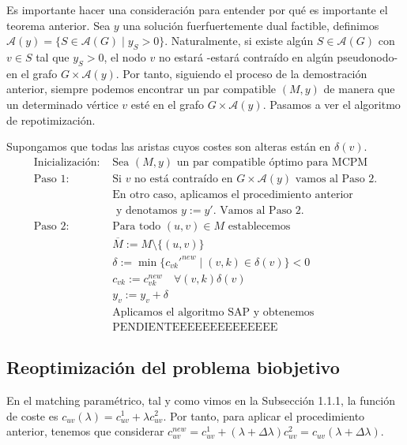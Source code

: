 \documentclass[twoside,a4paper,openright,12pt]{book}
\begin{document}
Es importante hacer una consideración para entender por qué es importante el teorema anterior. Sea $y$ una solución fuerfuertemente dual factible, definimos $\mathcal{A}(y)=\{S\in \mathcal{A}(G)\mid y_S>0\}$. Naturalmente, si existe algún $S \in \mathcal{A}(G)$ con $v\in S$ tal que $y_S >0$, el nodo $v$ no estará -estará contraído en algún pseudonodo- en el grafo $G\times \mathcal{A}(y)$. Por tanto, siguiendo el proceso de la demostración anterior, siempre podemos encontrar un par compatible $(M,y)$ de manera que un determinado vértice $v$ esté en el grafo $G\times \mathcal{A}(y)$. Pasamos a ver el algoritmo de repotimización. 

Supongamos que todas las aristas cuyos costes son alteras están en $\delta(v)$.
\begin{align*}
\text{Inicialización: }& \text{Sea $(M,y)$ un par compatible óptimo para MCPM}\\
\text{Paso 1: }& \text{Si $v$ no está contraído en $G\times \mathcal{A}(y)$ vamos al Paso 2.}\\
&\text{En otro caso, aplicamos el procedimiento anterior}\\
&\text{ y denotamos $y:=y'$. Vamos al Paso 2.}\\
\text{Paso 2: }& \text{Para todo $(u,v) \in M$ establecemos}\\
&\overline{M}:=M\setminus\{(u,v)\}\\
&\delta:=\min\{c_{vk}'^{new}\mid (v,k)\in \delta(v)\}<0\\
&c_{vk}:=c_{vk}^{new} \quad \forall (v,k)\delta (v)\\
&y_v:=y_v+\delta\\
&\text{Aplicamos el algoritmo SAP y obtenemos }\\
&\text{PENDIENTEEEEEEEEEEEEEE}
\end{align*}
\subsection{Reoptimización del problema biobjetivo}
En el matching paramétrico, tal y como vimos en la Subsección 1.1.1, la función de coste es $c_{uv}(\lambda) = c^1_{uv} + \lambda c^2_{uv}$. Por tanto, para aplicar el procedimiento anterior, tenemos que considerar $c_{uv}^{new} = c^1_{uv} + (\lambda + \Delta\lambda) c^2_{uv}= c_{uv}(\lambda+\Delta\lambda)$. 
\end{document}
